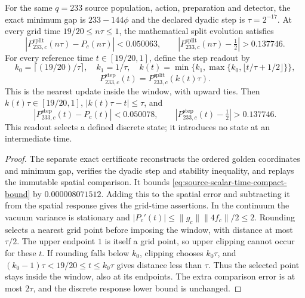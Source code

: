 \begin{proposition}
\label{prop:source-scalar-time-resolved}
For the same $q=233$ source population, action, preparation and detector,
the exact minimum gap is $233-144\phi$ and the declared dyadic step is
$\tau=2^{-17}$. At every grid time $19/20\le n\tau\le1$, the
mathematical split evolution satisfies
\[
 |P^{\mathrm{split}}_{233,c}(n\tau)-P_c(n\tau)|<0.050063,
 \qquad |P^{\mathrm{split}}_{233,c}(n\tau)-\tfrac12|>0.137746.
\]
For every reference time $t\in[19/20,1]$, define the step readout by
\[
 k_0=\lceil(19/20)/\tau\rceil,\quad k_1=1/\tau,\quad
 k(t)=\min\{k_1,\max\{k_0,\lfloor t/\tau+1/2\rfloor\}\},
\]
\[
 P^{\mathrm{step}}_{233,c}(t)=P^{\mathrm{split}}_{233,c}(k(t)\tau).
\]
This is the nearest update inside the window, with upward ties.
Then $k(t)\tau\in[19/20,1]$, $|k(t)\tau-t|\le\tau$, and
\[
 |P^{\mathrm{step}}_{233,c}(t)-P_c(t)|<0.050078,\qquad
 |P^{\mathrm{step}}_{233,c}(t)-\tfrac12|>0.137746.
\]
This readout selects a defined discrete state; it introduces no state at
an intermediate time.
\end{proposition}
\begin{proof}
The separate exact certificate reconstructs the ordered golden coordinates
and minimum gap, verifies the dyadic step and stability inequality, and
replays the immutable spatial comparison. It bounds
\eqref{eq:source-scalar-time-compact-bound} by $0.000008071512$.
Adding this to the spatial error and subtracting it from the spatial
response gives the grid-time assertions. In the continuum the vacuum
variance is stationary and
$|P_c'(t)|\le\|g_c\|\|4f_c\|/2\le2$.
Rounding selects a nearest grid point before imposing the window, with
distance at most $\tau/2$. The upper endpoint $1$ is itself a grid point,
so upper clipping cannot occur for these $t$. If rounding falls below
$k_0$, clipping chooses $k_0\tau$, and
$(k_0-1)\tau<19/20\le t\le k_0\tau$ gives distance less than $\tau$.
Thus the selected point stays inside the window, also at its endpoints.
The extra comparison error is at most $2\tau$, and the discrete response
lower bound is unchanged.
\end{proof}

